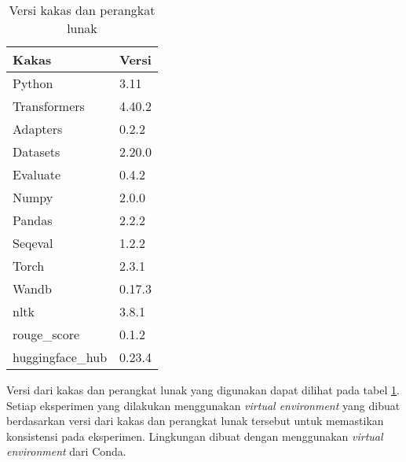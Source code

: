 \begin{table}[h]
    \vspace{0.25cm}
    \centering
    \caption{Versi kakas dan perangkat lunak}
    \label{table:tools-version}
    \begin{tabular}{ll}
        \toprule
        \textbf{Kakas} & \textbf{Versi} \\ 
        \midrule
        Python                & 3.11        \\
        Transformers          & 4.40.2      \\
        Adapters              & 0.2.2       \\
        Datasets              & 2.20.0      \\
        Evaluate              & 0.4.2       \\
        Numpy                 & 2.0.0       \\
        Pandas                & 2.2.2       \\
        Seqeval               & 1.2.2       \\
        Torch                 & 2.3.1       \\
        Wandb                 & 0.17.3      \\
        nltk                  & 3.8.1       \\
        rouge\_score          & 0.1.2       \\
        huggingface\_hub      & 0.23.4      \\
        \bottomrule
    \end{tabular}
\end{table}

Versi dari kakas dan perangkat lunak yang digunakan dapat dilihat pada tabel \ref{table:tools-version}. Setiap eksperimen yang dilakukan menggunakan \textit{virtual environment} yang dibuat berdasarkan versi dari kakas dan perangkat lunak tersebut untuk memastikan konsistensi pada eksperimen. Lingkungan dibuat dengan menggunakan \textit{virtual environment} dari Conda.
